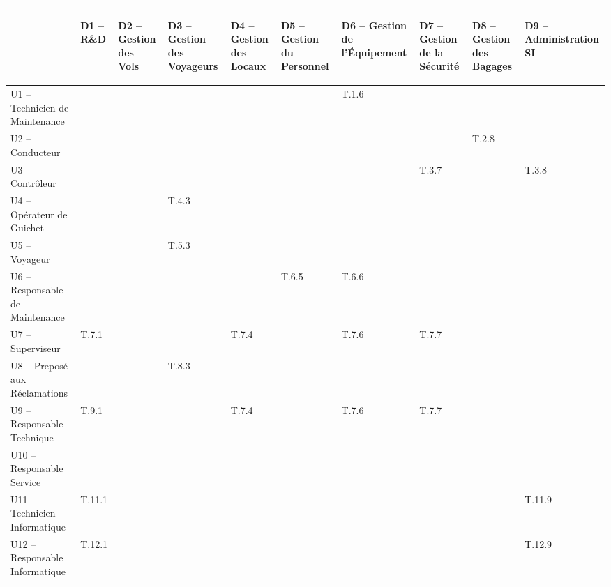 \providecommand{\DJSPU}[1]{}

\vspace{-2cm}
\begin{turn}{-90}
\begin {tabular} {| l | l | l | l | l | l | l | l | l | l | }
\hline
~
&\begin{sideways}D1 -- R\&D\end{sideways}
&\begin{sideways}D2 -- Gestion des Vols\end{sideways}
&\begin{sideways}D3 -- Gestion des Voyageurs\end{sideways}
&\begin{sideways}D4 -- Gestion des Locaux\end{sideways}
&\begin{sideways}D5 -- Gestion du Personnel\end{sideways}
&\begin{sideways}D6 -- Gestion de l'Équipement\end{sideways}
&\begin{sideways}D7 -- Gestion de la Sécurité\end{sideways}
&\begin{sideways}D8 -- Gestion des Bagages\end{sideways}
&\begin{sideways}D9 -- Administration SI\end{sideways}\\
\hline
U1 --  Technicien de Maintenance  & & & & & &T.1.6 & & &  \\
\hline
U2 --  Conducteur  & & & & & & & &T.2.8 &  \\
\hline
U3 --  Contrôleur  & & & & & & &T.3.7 & &T.3.8  \\
\hline
U4 --  Opérateur de Guichet  & & &T.4.3 & & & & & &  \\
\hline
U5 --  Voyageur  & & &T.5.3 & & & & & &  \\
\hline
U6 --  Responsable de Maintenance  & & & & &T.6.5 &T.6.6 & &  &\\
\hline
U7 --  Superviseur  &\DJSPU1 T.7.1 & & &T.7.4 & &T.7.6 &T.7.7 & &\\
\hline
U8 --  Preposé aux Réclamations  & & &T.8.3 & & & & & &\\
\hline
U9 --  Responsable Technique  &\DJSPU1 T.9.1 & & &T.7.4 & &T.7.6 &T.7.7 & &\\
\hline
U10 --  Responsable Service  & & & & & & & & &  \\
\hline
U11 --  Technicien Informatique  &T.11.1 & & & & & & & &T.11.9  \\
\hline
U12 --  Responsable Informatique  &T.12.1 & & & & & & & &T.12.9  \\
\hline
\end {tabular}
\end{turn}

